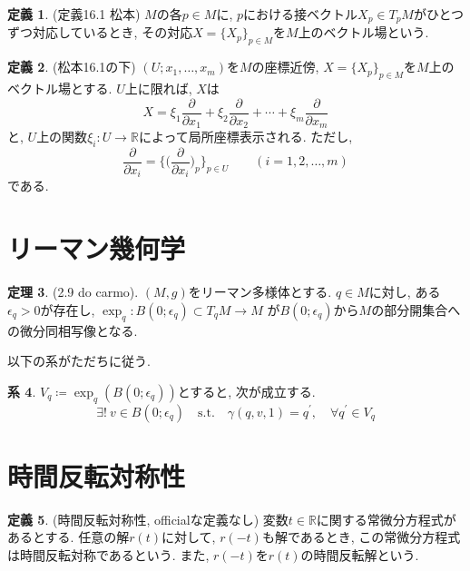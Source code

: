 \documentclass[uplatex]{suribt}
\theoremstyle{definition}
\newtheorem{theorem}{定理}[chapter]
\newtheorem{definition}[theorem]{定義}
\newtheorem{corollary}[theorem]{系}
\begin{document}
\begin{definition}
(定義16.1 松本) \(M\)の各\(p \in M\)に, \(p\)における接ベクトル\(X_p \in T_pM\)がひとつずつ対応しているとき, その対応\(X = \{X_p\}_{p \in M}\)を\(M\)上のベクトル場という.
\end{definition}

\begin{definition}
(松本16.1の下) \((U;x_1,\ldots,x_m)\)を\(M\)の座標近傍, \(X=\{X_p\}_{p \in M}\)を\(M\)上のベクトル場とする. \(U\)上に限れば, \(X\)は
\begin{equation*}
    X = \xi_1 \frac{\partial}{\partial x_1}+\xi_2 \frac{\partial}{\partial x_2}+ \cdots + \xi_m \frac{\partial}{\partial x_m} 
\end{equation*}
と, \(U\)上の関数\(\xi_i : U \to \mathbb{R}\)によって局所座標表示される. ただし,
\begin{equation*}
    \frac{\partial}{\partial x_i} = \bigg\{\bigg(\frac{\partial}{\partial x_i}\bigg)_{p}\bigg\}_{p \in U} \qquad (i=1,2,\ldots,m)
\end{equation*}
である.
\end{definition}

\section{リーマン幾何学}
\begin{theorem}
\label{diffeo}
(2.9 do carmo). \((M,g)\)をリーマン多様体とする. \(q \in M\)に対し, ある\(\epsilon_q > 0\)が存在し, \(\exp_q:B(0;\epsilon_q) \subset T_qM \to M\) が\(B(0;\epsilon_q)\)から\(M\)の部分開集合への微分同相写像となる.
\end{theorem}
以下の系がただちに従う.
\begin{corollary}
\label{uniquegeo}
\(V_q \coloneqq \exp_q(B(0;\epsilon_q))\)とすると, 次が成立する.
\begin{equation}
\exists! \: v \in B(0;\epsilon_q) \quad \text{s.t.} \quad \gamma(q,v,1)=q^{\prime}, \quad \forall q^{\prime} \in V_q
\end{equation}
\end{corollary}

\section{時間反転対称性}

\begin{definition}
(時間反転対称性, officialな定義なし) 変数\(t \in \mathbb{R}\)に関する常微分方程式があるとする. 任意の解\(r(t)\)に対して, \(r(-t)\)も解であるとき, この常微分方程式は時間反転対称であるという. また, \(r(-t)\)を\(r(t)\)の時間反転解という.
\end{definition}
\end{document}

